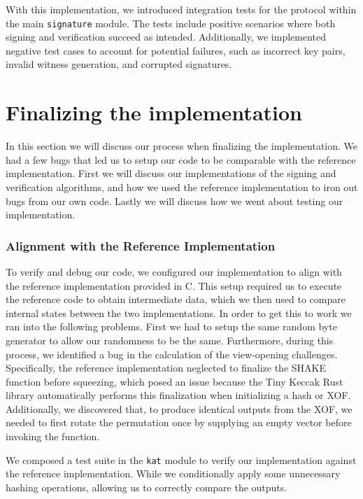 \documentclass[11pt]{report}
\theoremstyle{definition}
\theoremstyle{plain}
\begin{document}
With this implementation, we introduced integration tests for the protocol within the main \texttt{signature} module. The tests include positive scenarios where both signing and verification succeed as intended. Additionally, we implemented negative test cases to account for potential failures, such as incorrect key pairs, invalid witness generation, and corrupted signatures.


\section{Finalizing the implementation}\label{sub:final}
In this section we will discuss our process when finalizing the implementation. We had a few bugs that led us to setup our code to be comparable with the reference implementation. First we will discuss our implementations of the signing and verification algorithms, and how we used the reference implementation to iron out bugs from our own code. Lastly we will discuss how we went about testing our implementation.

\subsubsection{Alignment with the Reference Implementation}\label{sub:comparison_with_spec_impl}
To verify and debug our code, we configured our implementation to align with the reference implementation provided in C. This setup required us to execute the reference code to obtain intermediate data, which we then used to compare internal states between the two implementations. In order to get this to work we ran into the following problems. First we had to setup the same random byte generator to allow our randomness to be the same. Furthermore, during this process, we identified a bug in the calculation of the view-opening challenges. Specifically, the reference implementation neglected to finalize the SHAKE function before squeezing, which posed an issue because the Tiny Keccak Rust library automatically performs this finalization when initializing a hash or XOF.
Additionally, we discovered that, to produce identical outputs from the XOF, we needed to first rotate the permutation once by supplying an empty vector before invoking the function.

We composed a test suite in the \texttt{kat} module to verify our implementation against the reference implementation. While we conditionally apply some unnecessary hashing operations, allowing us to correctly compare the outputs.
\end{document}
